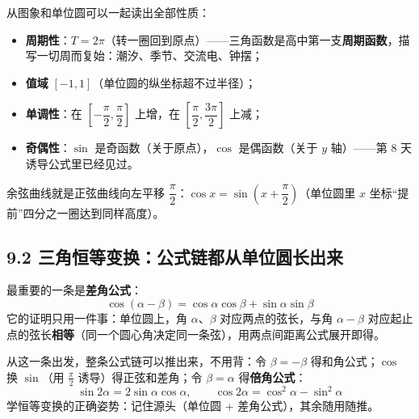 \documentclass[UTF8,a4paper,11pt]{ctexart}
\begin{document}
\begin{center}
\end{center}

从图象和单位圆可以一起读出全部性质：
\begin{itemize}
  \item \textbf{周期性}：$T = 2\pi$（转一圈回到原点）——三角函数是高中第一支\textbf{周期函数}，描写一切周而复始：潮汐、季节、交流电、钟摆；
  \item \textbf{值域} $[-1, 1]$（单位圆的纵坐标超不过半径）；
  \item \textbf{单调性}：在 $\left[-\dfrac{\pi}{2}, \dfrac{\pi}{2}\right]$ 上增，在 $\left[\dfrac{\pi}{2}, \dfrac{3\pi}{2}\right]$ 上减；
  \item \textbf{奇偶性}：$\sin$ 是奇函数（关于原点），$\cos$ 是偶函数（关于 $y$ 轴）——第 8 天诱导公式里已经见过。
\end{itemize}
余弦曲线就是正弦曲线向左平移 $\dfrac{\pi}{2}$：$\cos x = \sin\left(x + \dfrac{\pi}{2}\right)$（单位圆里 $x$ 坐标“提前”四分之一圈达到同样高度）。

\subsection*{9.2 三角恒等变换：公式链都从单位圆长出来}

最重要的一条是\textbf{差角公式}：
\[
\cos(\alpha - \beta) = \cos\alpha\cos\beta + \sin\alpha\sin\beta
\]
它的证明只用一件事：单位圆上，角 $\alpha$、$\beta$ 对应两点的弦长，与角 $\alpha-\beta$ 对应起止点的弦长\textbf{相等}（同一个圆心角决定同一条弦），用两点间距离公式展开即得。

从这一条出发，整条公式链可以推出来，不用背：令 $\beta = -\beta$ 得和角公式；$\cos$ 换 $\sin$（用 $\frac{\pi}{2}$ 诱导）得正弦和差角；令 $\beta = \alpha$ 得\textbf{倍角公式}：
\[
\sin 2\alpha = 2\sin\alpha\cos\alpha, \qquad \cos 2\alpha = \cos^2\alpha - \sin^2\alpha
\]
学恒等变换的正确姿势：记住源头（单位圆 + 差角公式），其余随用随推。
\end{document}
